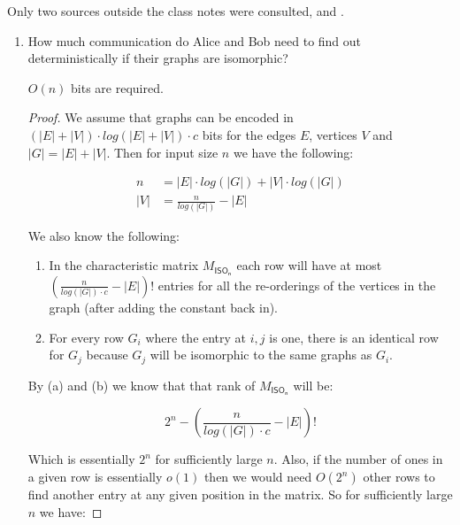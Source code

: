 \documentclass[usletter]{article}
\begin{document}

Only two sources outside the class notes were consulted, \cite{textbook} and \cite{orthsub}.

\begin{enumerate}
  \item How much communication do Alice and Bob need to find out deterministically if their graphs are isomorphic?

    \begin{claim}
      $O(n)$ bits are required.
    \end{claim}

    \begin{proof}
      We assume that graphs can be encoded in $(|E| + |V|) \cdot log(|E| + |V|) \cdot c$ bits for the edges $E$, vertices $V$ and $|G| = |E| + |V|$. Then for input size $n$ we have the following:

      \begin{align*}
        n &= |E| \cdot log(|G|) + |V| \cdot log(|G|) \\
       |V| &= \frac{n}{log(|G|)} - |E|
      \end{align*}

      We also know the following:

      \begin{enumerate}
        \item In the characteristic matrix $M_{\mathsf{ISO_n}}$ each row will have at most $\left (\frac{n}{log(|G|) \cdot c} - |E|\right)!$ entries for all the re-orderings of the vertices in the graph (after adding the constant back in).
        \item For every row $G_i$ where the entry at $i,j$ is one, there is an identical row for $G_j$ because $G_j$ will be isomorphic to the same graphs as $G_i$.
      \end{enumerate}

      By (a) and (b) we know that that rank of $M_{\mathsf{ISO_n}}$ will be:

      \begin{equation}
        2^n - \left (\frac{n}{log(|G|) \cdot c} - |E|\right)!
      \end{equation}

      Which is essentially $2^n$ for sufficiently large $n$. Also, if the number of ones in a given row is essentially $o(1)$ then we would need $O(2^n)$ other rows to find another entry at any given position in the matrix. So for sufficiently large $n$ we have:


\end{proof}
\end{enumerate}
\end{document}
